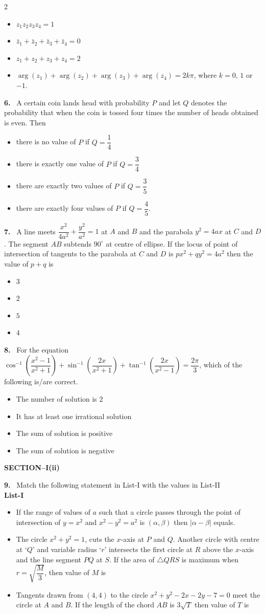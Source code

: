 \documentclass[10pt]{extarticle}
\newcommand{\sect}[1]{\par\smallskip\noindent\textbf{#1}\par}
\newcommand{\qn}[1]{\par\smallskip\noindent\textbf{#1.}~}
\newenvironment{qoptions}{\begin{itemize}[leftmargin=1.8em,itemsep=1pt,topsep=2pt,label={}]}{\end{itemize}}
\newcommand{\opt}[2]{\item[(#1)] #2}
\begin{document}
\begin{multicols}{2}
\begin{qoptions}
\opt{A}{$z_1z_2z_3z_4=1$}
\opt{B}{$\bar z_1+\bar z_2+\bar z_3+\bar z_4=0$}
\opt{C}{$z_1+z_2+z_3+z_4=2$}
\opt{D}{$\arg(z_1)+\arg(z_2)+\arg(z_3)+\arg(z_4)=2k\pi$, where $k=0,\,1$ or $-1$.}
\end{qoptions}
\qn{6} A certain coin lands head with probability $P$ and let $Q$ denotes the probability that when the coin is tossed four times the number of heads obtained is even. Then
\begin{qoptions}
\opt{A}{there is no value of $P$ if $Q=\dfrac14$}
\opt{B}{there is exactly one value of $P$ if $Q=\dfrac34$}
\opt{C}{there are exactly two values of $P$ if $Q=\dfrac35$}
\opt{D}{there are exactly four values of $P$ if $Q=\dfrac45$.}
\end{qoptions}
\qn{7} A line meets $\dfrac{x^2}{4a^2}+\dfrac{y^2}{a^2}=1$ at $A$ and $B$ and the parabola $y^2=4ax$ at $C$ and $D$. The segment $AB$ subtends $90^\circ$ at centre of ellipse. If the locus of point of intersection of tangents to the parabola at $C$ and $D$ is $px^2+qy^2=4a^2$ then the value of $p+q$ is
\begin{qoptions}
\opt{A}{$3$}
\opt{B}{$2$}
\opt{C}{$5$}
\opt{D}{$4$}
\end{qoptions}
\qn{8} For the equation $\cos^{-1}\!\left(\dfrac{x^2-1}{x^2+1}\right)+\sin^{-1}\!\left(\dfrac{2x}{x^2+1}\right)+\tan^{-1}\!\left(\dfrac{2x}{x^2-1}\right)=\dfrac{2\pi}{3}$, which of the following is/are correct.
\begin{qoptions}
\opt{A}{The number of solution is $2$}
\opt{B}{It has at least one irrational solution}
\opt{C}{The sum of solution is positive}
\opt{D}{The sum of solution is negative}
\end{qoptions}
\sect{SECTION--I(ii)}
\qn{9} Match the following statement in List-I with the values in List-II\\
\textbf{List-I}
\begin{qoptions}
\opt{P}{If the range of values of $a$ such that a circle passes through the point of intersection of $y=x^2$ and $x^2-y^2=a^2$ is $(\alpha,\beta)$ then $|\alpha-\beta|$ equals.}
\opt{Q}{The circle $x^2+y^2=1$, cuts the $x$-axis at $P$ and $Q$. Another circle with centre at `$Q$' and variable radius `$r$' intersects the first circle at $R$ above the $x$-axis and the line segment $PQ$ at $S$. If the area of $\triangle QRS$ is maximum when $r=\sqrt{\dfrac M3}$, then value of $M$ is}
\opt{R}{Tangents drawn from $(4,4)$ to the circle $x^2+y^2-2x-2y-7=0$ meet the circle at $A$ and $B$. If the length of the chord $AB$ is $3\sqrt T$ then value of $T$ is}

\end{qoptions}
\end{multicols}
\end{document}
